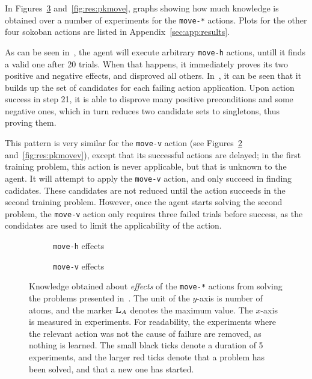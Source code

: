 \documentclass[../Master.tex]{subfiles}
\providecommand{\master}{..}
\begin{document}
In Figures~\ref{fig:res:ekmove} and~\ref{fig:res:pkmove}, graphs showing how much knowledge is obtained over a number of experiments for the \texttt{move-*} actions. Plots for the other four sokoban actions are listed in Appendix~\ref{sec:app:results}.


As can be seen in~, the agent will execute arbitrary \texttt{move-h} actions, untill it finds a valid one after 20 trials. When that happens, it immediately proves its two positive and negative effects, and disproved all others. In~, it can be seen that it builds up the set of candidates for each failing action application. Upon action success in step 21, it is able to disprove many positive preconditions and some negative ones, which in turn reduces two candidate sets to singletons, thus proving them.

This pattern is very similar for the \texttt{move-v} action (see Figures~\ref{fig:res:ekmovev} and~\ref{fig:res:pkmovev}), except that its successful actions are delayed; in the first training problem, this action is never applicable, but that is unknown to the agent. It will attempt to apply the \texttt{move-v} action, and only succeed in finding cadidates. These candidates are not reduced until the action succeeds in the second training problem. However, once the agent starts solving the second problem, the \texttt{move-v} action only requires three failed trials before success, as the condidates are used to limit the applicability of the action.

\begin{figure}
    \centering
    \begin{subfigure}{0.45\linewidth}
        \resizebox{\linewidth}{!}{}
        \caption{\texttt{move-h} effects}\label{fig:res:ekmoveh}
    \end{subfigure}
    \begin{subfigure}{0.45\linewidth}
        \resizebox{\linewidth}{!}{}
        \caption{\texttt{move-v} effects}\label{fig:res:ekmovev}
    \end{subfigure}
    \caption{Knowledge obtained about \emph{effects} of the \texttt{move-*} actions from solving the problems presented in~. The unit of the $y$-axis is number of atoms, and the marker $\mathbb{L}_A$ denotes the maximum value. The $x$-axis is measured in experiments. For readability, the experiments where the relevant action was not the cause of failure are removed, as nothing is learned. The small black ticks denote a duration of 5 experiments, and the larger red ticks denote that a problem has been solved, and that a new one has started.}\label{fig:res:ekmove}
\end{figure}
\end{document}

